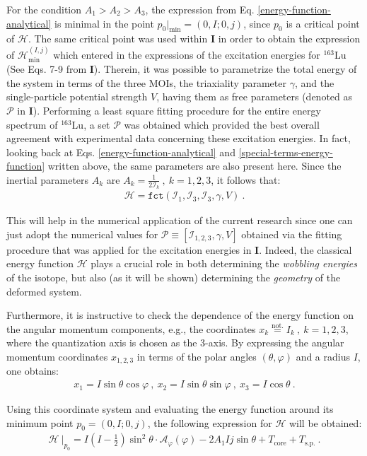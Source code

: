\documentclass[myclassdoc,debug]{rjparticle}
\begin{document}
For the condition $A_1>A_2>A_3$, the expression from Eq. \ref{energy-function-analytical} is minimal in the point $p_0|_\text{min}=(0,I;0,j)$, since $p_0$ is a critical point of $\mathcal{H}$. The same critical point was used within \textbf{I} in order to obtain the expression of $\mathcal{H}_\text{min}^{(I,j)}$ which entered in the expressions of the excitation energies for $^{163}$Lu (See Eqs. 7-9 from \textbf{I}). Therein, it was possible to parametrize the total energy of the system in terms of the three MOIs, the triaxiality parameter $\gamma$, and the single-particle potential strength $V$, having them as free parameters (denoted as $\mathcal{P}$ in \textbf{I}). Performing a least square fitting procedure for the entire energy spectrum of $^{163}$Lu, a set $\mathcal{P}$ was obtained which provided the best overall agreement with experimental data concerning these excitation energies. In fact, looking back at Eqs. \ref{energy-function-analytical} and \ref{special-terms-energy-function} written above, the same parameters are also present here. Since the inertial parameters $A_k$ are $A_k=\frac{1}{2\mathcal{I}_k}\ ,\ k=1,2,3$, it follows that:
\begin{align}
    \mathcal{H}=\texttt{fct}(\mathcal{I}_1,\mathcal{I}_3,\mathcal{I}_3,\gamma,V)\ .
\end{align}

This will help in the numerical application of the current research since one can just adopt the numerical values for $\mathcal{P}\equiv\left[\mathcal{I}_{1,2,3},\gamma,V\right]$ obtained via the fitting procedure that was applied for the excitation energies in \textbf{I}. Indeed, the classical energy function $\mathcal{H}$ plays a crucial role in both determining the \emph{wobbling energies} of the isotope, but also (as it will be shown) determining the \emph{geometry} of the deformed system. 

Furthermore, it is instructive to check the dependence of the energy function on the angular momentum components, e.g., the coordinates $x_k\overset{\mathrm{not.}}{=}I_k\ ,\ k=1,2,3$, where the quantization axis is chosen as the 3-axis. By expressing the angular momentum coordinates $x_{1,2,3}$ in terms of the polar angles $(\theta,\varphi)$ and a radius $I$, one obtains: 
\begin{align}
    x_1=I\sin\theta\cos\varphi\ ,\ x_2=I\sin\theta\sin\varphi\ ,\ x_3=I\cos\theta\ .
    \label{coordinate-parametrization}
\end{align}

Using this coordinate system and evaluating the energy function around its minimum point $p_0=(0,I;0,j)$, the following expression for $\mathcal{H}$ will be obtained:
\begin{align}
    \left. \mathcal{H}\ \right\vert_{p_0}=I\left(I-\frac{1}{2}\right)\sin^2\theta\cdot\mathcal{A}_\varphi(\varphi)-2A_1Ij\sin\theta+T_\text{core}+T_\text{s.p.}\ .
    \label{energy-function-minimal}
\end{align}
\end{document}
